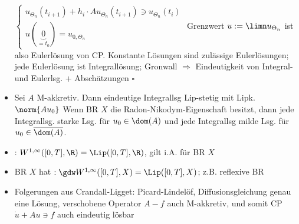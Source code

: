 \begin{itemize}
		$\left\lbrace\begin{array}{c}
			u_{\Theta_n}(t_{i+1})+h_i\cdot A u_{\Theta_n}(t_{i+1})\ni u_{\Theta_n}(t_i)\\
			u(\underbrace{0}_{=t_0})=u_{0,\Theta_n}
		\end{array}\right.$
		Grenzwert $u:=\limn u_{\Theta_n}$ ist also Eulerlösung von CP.
		Konstante Lösungen sind zulässige Eulerlösungen; jede Eulerlösung ist Integrallösung; Gronwall $\Rightarrow$ Eindeutigkeit von Integral- und Eulerlsg. + Abschätzungen $\square$ 
		\item {} Sei $A$ M-akkretiv.
		Dann eindeutige Integrallsg Lip-stetig mit Lipk. $\norm{Au_0}$%
		Wenn BR $X$ die Radon-Nikodym-Eigenschaft besitzt, dann jede Integrallsg. starke Lsg. für $u_0\in\dom(A)$ und jede Integrallsg milde Lsg. für $u_0\in\overline{\dom(A)}$.
		\item {}: $W^{1,\infty}([0,T],\R)=\Lip([0,T],\R)$, gilt i.A.  für BR $X$
		\item BR $X$ hat  $:\gdw W^{1,\infty}([0,T],X)=\Lip([0,T],X)$; z.B. reflexive BR
		\item Folgerungen aus Crandall-Ligget: Picard-Lindelöf, Diffusionsgleichung genau eine Lösung, verschobene Operator $A-f$ auch M-akkretiv, und somit CP $\dot{u}+Au\ni f$ auch eindeutig lösbar
	\end{itemize}
	
